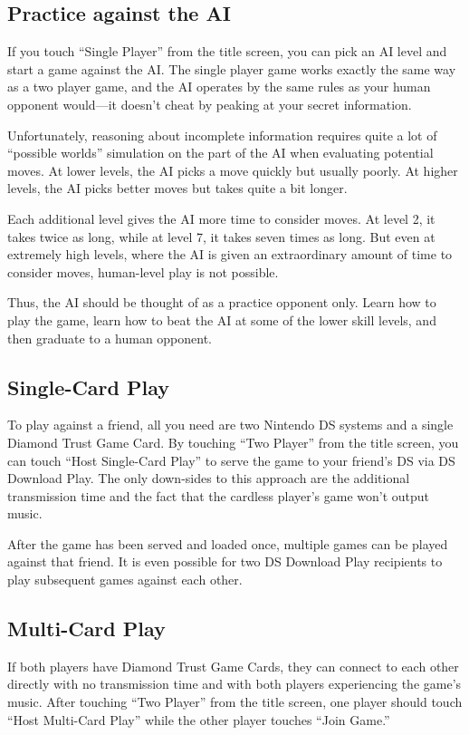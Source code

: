 \documentclass[8pt]{extbook}
\begin{document}
\subsection{Practice against the AI}

If you touch ``Single Player'' from the title screen, you can pick an AI level and start a game against the AI.  The single player game works exactly the same way as a two player game, and the AI operates by the same rules as your human opponent would---it doesn't cheat by peaking at your secret information.

Unfortunately, reasoning about incomplete information requires quite a lot of ``possible worlds'' simulation on the part of the AI when evaluating potential moves.  At lower levels, the AI picks a move quickly but usually poorly.  At higher levels, the AI picks better moves but takes quite a bit longer.

Each additional level gives the AI more time to consider moves.  At level 2, it takes twice as long, while at level 7, it takes seven times as long.  But even at extremely high levels, where the AI is given an extraordinary amount of time to consider moves, human-level play is not possible.

Thus, the AI should be thought of as a practice opponent only.  Learn how to play the game, learn how to beat the AI at some of the lower skill levels, and then graduate to a human opponent.

\subsection{Single-Card Play}
\label{sec:singleCard}
To play against a friend, all you need are two Nintendo DS systems and a single Diamond Trust Game Card.  By touching ``Two Player'' from the title screen, you can touch ``Host Single-Card Play'' to serve the game to your friend's DS via DS Download Play.  The only down-sides to this approach are the additional transmission time and the fact that the cardless player's game won't output music.

After the game has been served and loaded once, multiple games can be played against that friend.  It is even possible for two DS Download Play recipients to play subsequent games against each other.

\subsection{Multi-Card Play}
If both players have Diamond Trust Game Cards, they can connect to each other directly with no transmission time and with both players experiencing the game's music.  After touching ``Two Player'' from the title screen, one player should touch ``Host Multi-Card Play'' while the other player touches ``Join Game.''
\end{document}
